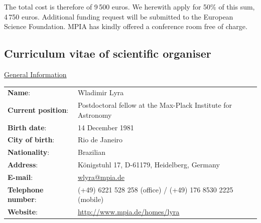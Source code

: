 \documentclass{article}
\newcommand{\hl}[1]{{\large{\sc \underline {#1}}}}
\begin{document}
The total cost is therefore of 9\,500 euros. We herewith
apply for 50\% of this sum, 4\,750 euros. Additional funding request 
will be submitted to the European Science Foundation. MPIA has 
kindly offered a conference room free of charge. 

\clearpage
\newpage

\subsection*{Curriculum vitae of scientific organiser}

\vspace{1cm}

\hl{General Information}

\vspace{2mm}

\begin{tabular}{ll}
  \textbf{Name}: & Wladimir Lyra \\
  \textbf{Current position}: & Postdoctoral fellow at the Max-Plack Institute for Astronomy\\
  \textbf{Birth date}: & 14 December 1981 \\
  \textbf{City of birth}: & Rio de Janeiro \\
  \textbf{Nationality}: & Brazilian \\
  \textbf{Address}: & K\"onigstuhl 17, D-61179, Heidelberg, Germany \\
  \textbf{E-mail}: & \url{wlyra@mpia.de} \\
  \textbf{Telephone number}: &
   (+49) 6221 528 258 (office) / (+49) 176 8530 2225 (mobile) \\
  \textbf{Website}: & \url{http://www.mpia.de/homes/lyra}
\end{tabular}

\vspace{5mm}

\hspace{-.55cm}\hl{Education}
\end{document}
